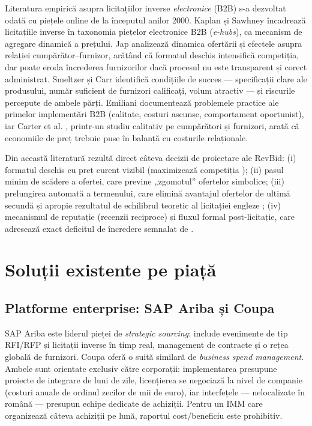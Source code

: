 Literatura empirică asupra licitațiilor inverse \textit{electronice} (B2B) s-a dezvoltat odată cu piețele online de la începutul anilor 2000. Kaplan și Sawhney \cite{kaplan2000} încadrează licitațiile inverse în taxonomia piețelor electronice B2B (\textit{e-hubs}), ca mecanism de agregare dinamică a prețului. Jap \cite{jap2002} analizează dinamica ofertării și efectele asupra relației cumpărător--furnizor, arătând că formatul deschis intensifică competiția, dar poate eroda încrederea furnizorilor dacă procesul nu este transparent și corect administrat. Smeltzer și Carr \cite{smeltzer2003} identifică condițiile de succes --- specificații clare ale produsului, număr suficient de furnizori calificați, volum atractiv --- și riscurile percepute de ambele părți. Emiliani \cite{emiliani2000} documentează problemele practice ale primelor implementări B2B (calitate, costuri ascunse, comportament oportunist), iar Carter et al. \cite{carter2004}, printr-un studiu calitativ pe cumpărători și furnizori, arată că economiile de preț trebuie puse în balanță cu costurile relaționale.

Din această literatură rezultă direct câteva decizii de proiectare ale RevBid: (i) formatul deschis cu preț curent vizibil (maximizează competiția \cite{jap2002}); (ii) pasul minim de scădere a ofertei, care previne „zgomotul'' ofertelor simbolice; (iii) prelungirea automată a termenului, care elimină avantajul ofertelor de ultimă secundă și apropie rezultatul de echilibrul teoretic al licitației engleze \cite{mcafee1987}; (iv) mecanismul de reputație (recenzii reciproce) și fluxul formal post-licitație, care adresează exact deficitul de încredere semnalat de \cite{emiliani2000, smeltzer2003}.

\section{Soluții existente pe piață}

\subsection{Platforme enterprise: SAP Ariba și Coupa}

SAP Ariba \cite{aribaweb} este liderul pieței de \textit{strategic sourcing}: include evenimente de tip RFI/RFP și licitații inverse în timp real, management de contracte și o rețea globală de furnizori. Coupa \cite{coupaweb} oferă o suită similară de \textit{business spend management}. Ambele sunt orientate exclusiv către corporații: implementarea presupune proiecte de integrare de luni de zile, licențierea se negociază la nivel de companie (costuri anuale de ordinul zecilor de mii de euro), iar interfețele --- nelocalizate în română --- presupun echipe dedicate de achiziții. Pentru un IMM care organizează câteva achiziții pe lună, raportul cost/beneficiu este prohibitiv.

